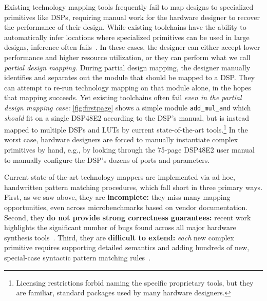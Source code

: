 Existing technology mapping tools
  frequently fail to map designs
  to
  specialized primitives like DSPs,
  requiring manual work for the hardware designer
  to recover the performance of their design.
While existing toolchains
  have the ability to automatically infer
  locations where specialized primitives
  can be used in large designs,
  inference often fails~\cite{xilinxforum1,xilinxforum2,inferringreddit}.
In these cases, the designer can either
  accept lower performance and higher resource
  utilization,
  or they can perform
  what we call
  \textit{partial design mapping.}
During partial design mapping, 
  the designer
  manually identifies and separates out
  the module that should be mapped
  to a DSP.
They can attempt to re-run technology mapping
  on that module alone,
  in the hopes that mapping succeeds.
Yet existing toolchains often fail
  \textit{even in the partial design mapping case:}
  \cref{fig:firstpage} shows a
  simple module
  \texttt{add\_mul\_and}
  which \textit{should} fit on a single DSP48E2
  according to the DSP's manual,
  but is instead mapped to multiple DSPs and LUTs
  by current state-of-the-art tools.\footnote{
    Licensing restrictions forbid naming the
    specific proprietary tools, but they are familiar,
    standard packages used by many hardware designers.
  }
In the worst case,
  hardware designers are forced to manually
  instantiate complex primitives by hand,
  e.g., by looking through the 75-page
  DSP48E2 user manual
  to manually configure the DSP's dozens
  of ports and parameters.

Current state-of-the-art
  technology mappers 
  are implemented via
  ad hoc, handwritten pattern matching procedures,
  which
  fall short in three primary ways.
First,
  as we saw above,
  they are \textbf{incomplete:}
  they miss many mapping opportunities,
  even across microbenchmarks based on vendor documentation.
Second, they \textbf{do not provide strong correctness guarantees:}
  recent work highlights the significant number of bugs found across 
  all major hardware synthesis tools~\cite{herklotz2020finding}.
Third, they are \textbf{difficult to extend:}
  \textit{each} new complex primitive requires
  supporting detailed semantics
  and adding hundreds of new, special-case
  syntactic pattern matching rules~\cite{wolf2013yosys}.



